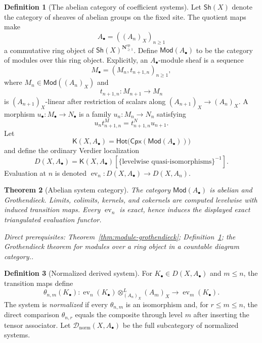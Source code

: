 \documentclass[10pt]{article}
\newtheorem{theorem}{Theorem}[section]
\theoremstyle{definition}
\newtheorem{definition}[theorem]{Definition}
\newcommand{\Dnorm}{\mathcal D_{\mathrm{norm}}}
\newcommand{\depends}[1]{\par\smallskip\noindent\textit{Direct prerequisites:} #1.}
\begin{document}
\begin{definition}[The abelian category of coefficient systems]
\label{def:system-abelian}
Let $\mathsf{Sh}(X)$ denote the category of sheaves of abelian groups on the
fixed site.  The quotient maps make
\[
 A_\bullet=((A_n)_X)_{n\geq1}
\]
a commutative ring object of
$\mathsf{Sh}(X)^{\mathbf N_{\geq1}^{\mathrm{op}}}$.  Define
$\mathsf{Mod}(A_\bullet)$ to be the category of modules over this ring
object.  Explicitly, an $A_\bullet$-module sheaf is a sequence
\[
 M_\bullet=(M_n,t_{n+1,n})_{n\geq1},
\]
where $M_n\in\mathsf{Mod}((A_n)_X)$ and
\[
 t_{n+1,n}:M_{n+1}\longrightarrow M_n
\]
is $(A_{n+1})_X$-linear after restriction of scalars along
$(A_{n+1})_X\to(A_n)_X$.  A morphism $u_\bullet:M_\bullet\to N_\bullet$ is
a family $u_n:M_n\to N_n$ satisfying
\[
 u_n t^M_{n+1,n}=t^N_{n+1,n}u_{n+1}.
\]
Let
\[
 \mathsf K(X,A_\bullet)=
 \mathsf{Hot}\bigl(\mathsf{Cpx}(\mathsf{Mod}(A_\bullet))\bigr)
\]
and define the ordinary Verdier localization
\[
 D(X,A_\bullet)=
 \mathsf K(X,A_\bullet)
 [\{\text{levelwise quasi-isomorphisms}\}^{-1}].
\]
Evaluation at $n$ is denoted
$\operatorname{ev}_n:D(X,A_\bullet)\to D(X,A_n)$.
\end{definition}

\begin{theorem}[Abelian system category]\label{thm:system-abelian}
The category $\mathsf{Mod}(A_\bullet)$ is abelian and Grothendieck.  Limits,
colimits, kernels, and cokernels are computed levelwise with induced
transition maps.  Every $\operatorname{ev}_n$ is exact, hence induces the
displayed exact triangulated evaluation functor.
\depends{Theorem~\ref{thm:module-grothendieck};
Definition~\ref{def:system-abelian}; the Grothendieck theorem for modules
over a ring object in a countable diagram category.}
\end{theorem}

\begin{definition}[Normalized derived system]\label{def:normalized-system}
For $K_\bullet\in D(X,A_\bullet)$ and $m\leq n$, the transition maps define
\[
 \theta_{n,m}(K_\bullet):
 \operatorname{ev}_n(K_\bullet)
   \otimes^L_{(A_n)_X}(A_m)_X
 \longrightarrow\operatorname{ev}_m(K_\bullet).
\]
The system is \emph{normalized} if every $\theta_{n,m}$ is an isomorphism
and, for $r\leq m\leq n$, the direct comparison $\theta_{n,r}$ equals the
composite through level $m$ after inserting the tensor associator.  Let
$\Dnorm(X,A_\bullet)$ be the full subcategory of normalized systems.
\end{definition}
\end{document}
